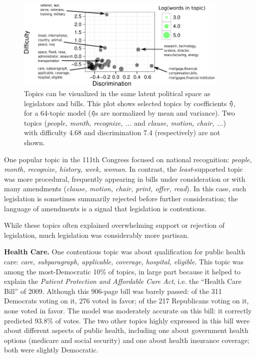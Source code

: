 \begin{figure}
  \center
  \includegraphics[width=0.9\textwidth]{chapter_spatial_voting_with_text/figures/134_64_topic_plot.pdf}
  \caption{Topics can be visualized in the same latent political space
    as legislators and bills.  This plot shows selected topics by
    coefficients $\bm \hat \eta$, for a 64-topic model ($\bm \hat \eta$s are normalized by
    mean and variance).  Two topics (\emph{people, month, recognize, ...}
    and \emph{clause, motion, chair, ...}) with difficulty 4.68 and
    discrimination 7.4 (respectively) are not shown.}
  \label{fig:topics}
\end{figure}

One popular topic in the 111th Congress focused on national
recognition: \emph{people, month, recognize, history, week, woman}.
In contrast, the \emph{least}-supported topic was more procedural,
frequently appearing in bills under consideration or with many
amendments (\emph{clause, motion, chair, print, offer, read}).  In
this case, such legislation is sometimes summarily rejected before
further consideration; the language of amendments is a signal that
legislation is contentious.

While these topics often explained overwhelming support or rejection
of legislation, much legislation was considerably more partisan.

\textbf{Health Care.}  One contentious topic was about
qualification for public health care: \emph{care, subparagraph,
applicable, coverage, hospital, eligible}.  This topic was among the
most-Democratic 10\% of topics, in large part because it helped to
explain the \emph{Patient Protection and Affordable Care Act},
i.e. the ``Health Care Bill'' of 2009.  Although this 906-page bill
was barely passed: of the 311 Democrats voting on
it, 276 voted in favor; of the 217 Republicans voting on it, none
voted in favor.  The model was moderately accurate on this bill: it
correctly predicted 93.8\% of votes.  The two other topics highly
expressed in this bill were about different aspects of public health,
including one about government health options (medicare and social
security) and one about health insurance coverage; both were slightly
Democratic.

